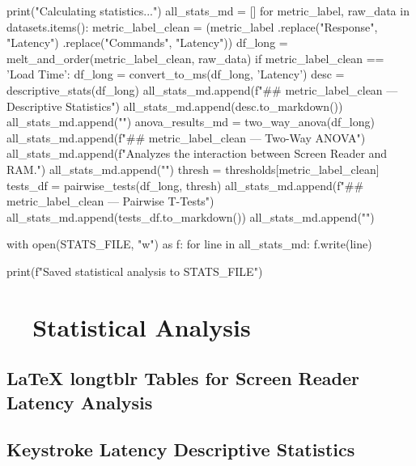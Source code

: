 \begin{pyverbatim}
	print("Calculating statistics...")
	all_stats_md = []
	for metric_label, raw_data in datasets.items():
	metric_label_clean = (metric_label
	.replace("Response", "Latency")
	.replace("Commands", "Latency"))
	df_long = melt_and_order(metric_label_clean, raw_data)
	if metric_label_clean == 'Load Time':
	df_long = convert_to_ms(df_long, 'Latency')
	desc = descriptive_stats(df_long)
	all_stats_md.append(f"## {metric_label_clean} — Descriptive Statistics\n")
	all_stats_md.append(desc.to_markdown())
	all_stats_md.append("\n")
	anova_results_md = two_way_anova(df_long)
	all_stats_md.append(f"## {metric_label_clean} — Two-Way ANOVA\n")
	all_stats_md.append(f"Analyzes the interaction between Screen Reader and RAM.\n{}\n")
	all_stats_md.append("\n")
	thresh = thresholds[metric_label_clean]
	tests_df = pairwise_tests(df_long, thresh)
	all_stats_md.append(f"## {metric_label_clean} — Pairwise T-Tests\n")
	all_stats_md.append(tests_df.to_markdown())
	all_stats_md.append("\n")

	with open(STATS_FILE, "w") as f:
	for line in all_stats_md:
	f.write(line)

	print(f"Saved statistical analysis to {STATS_FILE}")
\end{pyverbatim}

\section{~~Statistical Analysis}
\subsection{LaTeX longtblr Tables for Screen Reader Latency Analysis}

\subsection{ Keystroke Latency Descriptive Statistics}

